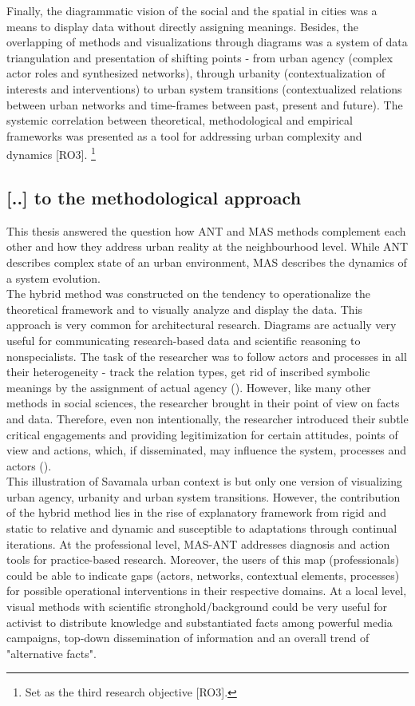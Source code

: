 \documentclass[11pt]{report}
\begin{document}
{Finally, the diagrammatic vision of the social and the spatial  in cities was a means to display data without directly assigning meanings.
Besides, the overlapping of methods and visualizations through diagrams was a system of data triangulation and presentation of shifting points - from urban agency (complex actor roles and synthesized networks), through urbanity (contextualization of interests and interventions) to urban system transitions (contextualized relations between urban networks and time-frames between past, present and future). The systemic correlation between theoretical, methodological and empirical frameworks was presented as a tool for addressing urban complexity and dynamics [RO3].
\footnote{Set as the third research objective [RO3].}

\subsection{[..] to the methodological approach}

This thesis answered the question how ANT and MAS methods complement each other and how they address urban reality at the neighbourhood level.
While ANT describes complex state of an urban environment, MAS describes the dynamics of a system evolution.
\\

The hybrid method was constructed on the tendency to operationalize the theoretical framework and to visually analyze and display the data.
This approach is very common for architectural research.
Diagrams are actually very useful for communicating research-based data and scientific reasoning to nonspecialists.
The task of the researcher was to follow actors and processes in all their heterogeneity - track the relation types, get rid of inscribed symbolic meanings by the assignment of actual agency (\href{Nimmo}{\citealt{Nimmo_actor_2011}}).
However, like many other methods in social sciences, 
the researcher brought in their point of view on facts and data.
Therefore, even non intentionally, the researcher introduced their subtle critical engagements and providing legitimization for certain attitudes, points of view and actions, which, if disseminated, may influence the system, processes and actors (\href{Baiocchi}{\citealt{Baiocchi_actor_2013}}).
\\

This illustration of Savamala urban context is but only one version of visualizing urban agency, urbanity and urban system transitions.
However, the contribution of the hybrid method lies in the rise of explanatory framework from rigid and static to relative and dynamic and susceptible to adaptations through continual iterations.
At the professional level, MAS-ANT addresses diagnosis and action tools for practice-based research.
Moreover, the users of this map (professionals) could be able to indicate gaps (actors, networks, contextual elements, processes) for possible operational interventions in their respective domains.
At a local level, visual methods with scientific stronghold/background could be very useful for activist to distribute knowledge and substantiated facts among powerful media campaigns, top-down dissemination of information and an overall trend of "alternative facts".

}
\end{document}
